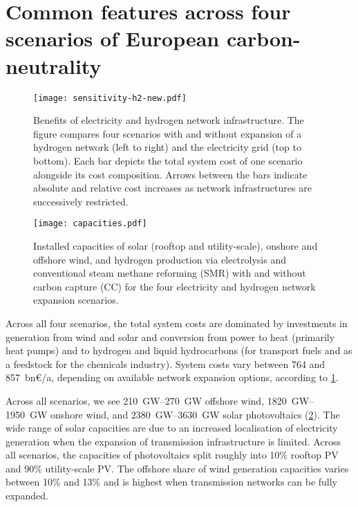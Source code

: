 \section*{Common features across four scenarios of European carbon-neutrality}
\label{sec:es}

\begin{figure}
    \centering
    \texttt{[image: sensitivity-h2-new.pdf]}
    \caption{Benefits of electricity and hydrogen network infrastructure. The
    figure compares four scenarios with and without expansion of a hydrogen
    network (left to right) and the electricity grid (top to bottom). Each bar
    depicts the total system cost of one scenario alongside its cost
    composition. Arrows between the bars indicate absolute and relative cost
    increases as network infrastructures are successively restricted.}
    \label{fig:sensitivity-h2}
\end{figure}

\begin{figure}
    \centering
    \texttt{[image: capacities.pdf]}
    \caption{Installed capacities of solar (rooftop and utility-scale), onshore
    and offshore wind, and hydrogen production via electrolysis and conventional steam
    methane reforming (SMR) with and without carbon capture (CC) for the four
    electricity and hydrogen network expansion scenarios.}
    \label{fig:capacities}
\end{figure}

Across all four scenarios, the total system costs are dominated by investments
in generation from wind and solar and conversion from power to heat (primarily
heat pumps) and to hydrogen and liquid hydrocarbons (for transport fuels and as
a feedstock for the chemicals industry). System costs vary between 764 and
857~bn\euro/a, depending on available network expansion options, according to
\cref{fig:sensitivity-h2}.

Across all scenarios, we see \SIrange{210}{270}{\giga\watt} offshore wind,
\SIrange{1820}{1950}{\giga\watt} onshore wind, and
\SIrange{2380}{3630}{\giga\watt} solar photovoltaics (\cref{fig:capacities}).
The wide range of solar capacities are due to an increased localisation of
electricity generation when the expansion of transmission infrastructure is
limited. Across all scenarios, the capacities of photovoltaics split roughly
into 10\% rooftop PV and 90\% utility-scale PV. The offshore share of wind
generation capacities varies between 10\% and 13\% and is highest when
transmission networks can be fully expanded.

